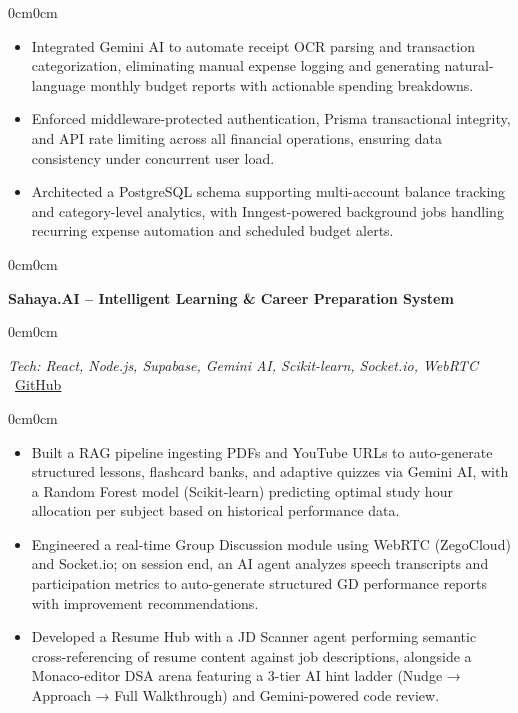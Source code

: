 \documentclass[10pt, letterpaper]{article}
\newenvironment{highlights}{
    \begin{itemize}[leftmargin=10pt, itemsep=1pt, topsep=2pt]
}{
    \end{itemize}
}
\newenvironment{onecolentry}{
    \begin{adjustwidth}{0cm}{0cm}
}{
    \end{adjustwidth}
}
\begin{document}
\begin{onecolentry}
\begin{highlights}
\item Integrated Gemini AI to automate receipt OCR parsing and transaction categorization, eliminating manual expense logging and generating natural-language monthly budget reports with actionable spending breakdowns.
\item Enforced middleware-protected authentication, Prisma transactional integrity, and API rate limiting across all financial operations, ensuring data consistency under concurrent user load.
\item Architected a PostgreSQL schema supporting multi-account balance tracking and category-level analytics, with Inngest-powered background jobs handling recurring expense automation and scheduled budget alerts.
\end{highlights}
\end{onecolentry}

\vspace{0.1cm}

\begin{onecolentry}
\textbf{Sahaya.AI -- Intelligent Learning \& Career Preparation System}
\end{onecolentry}

\begin{onecolentry}
\textit{Tech: React, Node.js, Supabase, Gemini AI, Scikit-learn, Socket.io, WebRTC} \hfill
{\color{iconGray}\faGithub}~\href{https://github.com/Omkarop0808}{GitHub}
\end{onecolentry}

\begin{onecolentry}
\begin{highlights}
\item Built a RAG pipeline ingesting PDFs and YouTube URLs to auto-generate structured lessons, flashcard banks, and adaptive quizzes via Gemini AI, with a Random Forest model (Scikit-learn) predicting optimal study hour allocation per subject based on historical performance data.
\item Engineered a real-time Group Discussion module using WebRTC (ZegoCloud) and Socket.io; on session end, an AI agent analyzes speech transcripts and participation metrics to auto-generate structured GD performance reports with improvement recommendations.
\item Developed a Resume Hub with a JD Scanner agent performing semantic cross-referencing of resume content against job descriptions, alongside a Monaco-editor DSA arena featuring a 3-tier AI hint ladder (Nudge → Approach → Full Walkthrough) and Gemini-powered code review.
\end{highlights}
\end{onecolentry}
\end{document}
